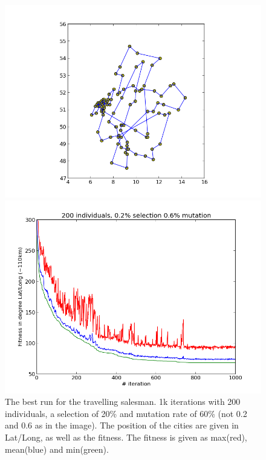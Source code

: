 \documentclass{scrartcl}
\begin{document}
\begin{figure}[H]
\centering
\begin{minipage}{.5\textwidth}
  \centering
  \includegraphics[width=.8\linewidth]{img/ex3/68,46-1-1000-200-0,2-0,6.png}
\end{minipage}%
\begin{minipage}{.5\textwidth}
  \centering
  \includegraphics[width=.8\linewidth]{img/ex3/68,46-1-1000-200-0,2-0,6-fitness.png}
\end{minipage}
\caption{The best run for the travelling salesman. 1k iterations with 200 individuals, a selection of 20\% and mutation rate of 60\% (not 0.2 and 0.6 as in the image). The position of the cities are given in Lat/Long, as well as the fitness. The fitness is given as max(red), mean(blue) and min(green).}
\label{fig:}
\end{figure}
\end{document}
